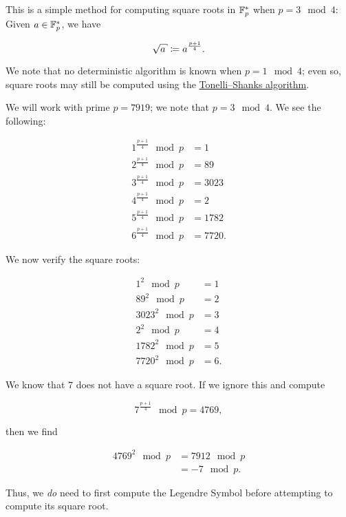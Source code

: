 This is a simple method for computing square roots
in $\mathbb{F}_{p}^{*}$ when $p = 3 \mod 4$:
Given $a\in\mathbb{F}_{p}^{*}$, we have

\begin{equation}
    \sqrt{a} \mathDef{} a^{\frac{p+1}{4}}.
\end{equation}

\noindent
We note that no deterministic algorithm
is known when $p = 1 \mod 4$;
even so, square roots may still be computed using the
\href{https://en.wikipedia.org/wiki/Tonelli%E2%80%93Shanks_algorithm}{Tonelli--Shanks algorithm}.

\begin{example}

We will work with prime $p = 7919$;
we note that $p = 3 \mod 4$.
We see the following:

\begin{align}
    1^{\frac{p+1}{4}} \mod p &= 1
        \nonumber\\
    2^{\frac{p+1}{4}} \mod p &= 89
        \nonumber\\
    3^{\frac{p+1}{4}} \mod p &= 3023
        \nonumber\\
    4^{\frac{p+1}{4}} \mod p &= 2
        \nonumber\\
    5^{\frac{p+1}{4}} \mod p &= 1782
        \nonumber\\
    6^{\frac{p+1}{4}} \mod p &= 7720.
\end{align}

\noindent
We now verify the square roots:

\begin{align}
    1^{2} \mod p &= 1
        \nonumber\\
    89^{2} \mod p &= 2
        \nonumber\\
    3023^{2} \mod p &= 3
        \nonumber\\
    2^{2} \mod p &= 4
        \nonumber\\
    1782^{2} \mod p &= 5
        \nonumber\\
    7720^{2} \mod p &= 6.
\end{align}

We know that $7$ does not have a square root.
If we ignore this and compute

\begin{equation}
    7^{\frac{p+1}{4}} \mod p = 4769,
\end{equation}

\noindent
then we find

\begin{align}
    4769^{2} \mod p &= 7912 \mod p \nonumber\\
        &= -7 \mod p.
\end{align}

\noindent
Thus, we \emph{do} need to first compute the Legendre Symbol
before attempting to compute its square root.
\end{example}
